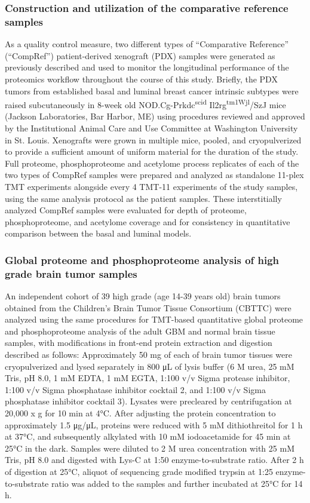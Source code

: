 \subsubsection{Construction and utilization of the comparative reference samples}
As a quality control measure, two different types of ``Comparative Reference'' (``CompRef'') patient-derived xenograft (PDX) samples were generated as previously described \cite{lis_ellismj:EndocrinetherapyresistantESR12013,tabbdl_lieblerdc:ReproducibilityDifferential2016} and used to monitor the longitudinal performance of the proteomics workflow throughout the course of this study. Briefly, the PDX tumors from established basal and luminal breast cancer intrinsic subtypes were raised subcutaneously in 8-week old NOD.Cg-Prkdc\textsuperscript{scid} Il2rg\textsuperscript{tm1Wjl}/SzJ mice (Jackson Laboratories, Bar Harbor, ME) using procedures reviewed and approved by the Institutional Animal Care and Use Committee at Washington University in St. Louis. Xenografts were grown in multiple mice, pooled, and cryopulverized to provide a sufficient amount of uniform material for the duration of the study. Full proteome, phosphoproteome and acetylome process replicates of each of the two types of CompRef samples were prepared and analyzed as standalone 11-plex TMT experiments alongside every 4 TMT-11 experiments of the study samples, using the same analysis protocol as the patient samples. These interstitially analyzed CompRef samples were evaluated for depth of proteome, phosphoproteome, and acetylome coverage and for consistency in quantitative comparison between the basal and luminal models.

\subsubsection{Global proteome and phosphoproteome analysis of high grade brain tumor samples}
An independent cohort of 39 high grade (age 14-39 years old) brain tumors obtained from the Children’s Brain Tumor Tissue Consortium (CBTTC) were analyzed using the same procedures for TMT-based quantitative global proteome and phosphoproteome analysis of the adult GBM and normal brain tissue samples, with modifications in front-end protein extraction and digestion described as follows: Approximately 50 mg of each of brain tumor tissues were cryopulverized and lysed separately in 800 μL of lysis buffer (6 M urea, 25 mM Tris, pH 8.0, 1 mM EDTA, 1 mM EGTA, 1:100 v/v Sigma protease inhibitor, 1:100 v/v Sigma phosphatase inhibitor cocktail 2, and 1:100 v/v Sigma phosphatase inhibitor cocktail 3). Lysates were precleared by centrifugation at 20,000 x g for 10 min at 4°C. After adjusting the protein concentration to approximately 1.5 μg/μL, proteins were reduced with 5 mM dithiothreitol for 1 h at 37°C, and subsequently alkylated with 10 mM iodoacetamide for 45 min at 25°C in the dark. Samples were diluted to 2 M urea concentration with 25 mM Tris, pH 8.0 and digested with Lys-C at 1:50 enzyme-to-substrate ratio. After 2 h of digestion at 25°C, aliquot of sequencing grade modified trypsin at 1:25 enzyme-to-substrate ratio was added to the samples and further incubated at 25°C for 14 h.
